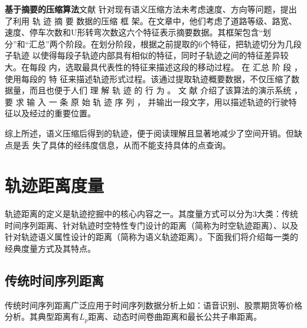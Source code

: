 
\textbf{基于摘要的压缩算法}文献\cite{STMaker} 针对现有语义压缩方法未考虑速度、方向等问题，提出了利用 轨 迹 摘 要 数据的压缩 框 架。在文章中，他们考虑了道路等级、路宽、速度、停车次数和U形转弯次数这六个特征表示摘要数据。其框架包含``划分''和``汇总''两个阶段。在划分阶段，根据之前提取的6个特征，把轨迹切分为几段 子轨迹 以使得每段子轨迹内部具有相似的特征，同时子轨迹之间的特征差异较大。在每段 内，选取最具代表性的特征来描述这段的移动过程。
在 汇总 阶 段 ，使用每段的 特 征来描述轨迹形式过程。该通过提取轨迹概要数据，不仅压缩了数据量，而且也便于人们 理 解 轨 迹 的 行 为 。
文 献 \cite{Makesense}介绍了该算法的演示系统 ，要 求 输 入 一 条 原 始 轨 迹 序 列 ， 并输出一段文字，用以描述轨迹的行驶特征以及经过的重要位置。

综上所述，语义压缩后得到的轨迹，便于阅读理解且显著地减少了空间开销。但缺点是丢 失了具体的经纬度信息，从而不能支持具体的点查询。



\section{轨迹距离度量}\label{sec-c2-measures}
轨迹距离的定义是轨迹挖掘中的核心内容之一。其度量方式可以分为3大类：传统时间序列距离、针对轨迹时空特性专门设计的距离（简称为时空轨迹距离）、以及针对轨迹语义属性设计的距离（简称为语义轨迹距离）。下面我们将介绍每一类的经典度量方式及其特点。

\subsection{传统时间序列距离}
传统时间序列距离广泛应用于时间序列数据分析上如：语音识别、股票期货等价格分析。其典型距离有$L_{p}$距离、动态时间卷曲距离和最长公共子串距离。

